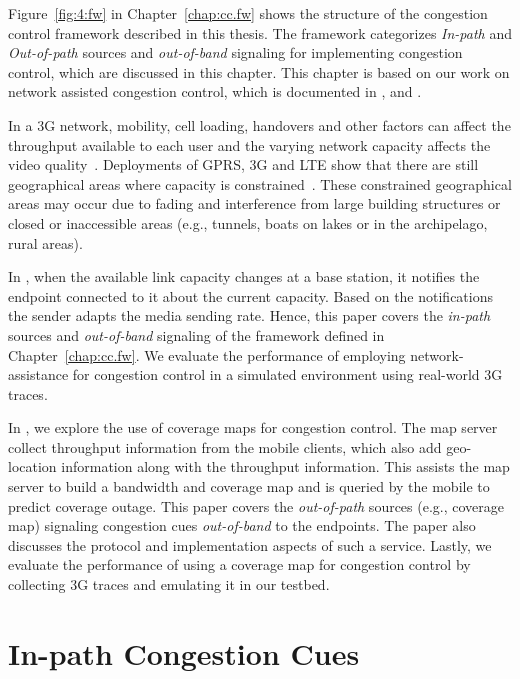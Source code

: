 Figure~\ref{fig:4:fw} in Chapter~\ref{chap:cc.fw} shows the structure of the
congestion control framework described in this thesis. The framework
categorizes \emph{In-path} and \emph{Out-of-path} sources and
\emph{out-of-band} signaling for implementing congestion control, which are
discussed in this chapter. This chapter is based on our work on network
assisted congestion control, which is documented in ,
 and \cite{glass:patent}.

In a 3G network, mobility, cell loading, handovers and other factors can
affect the throughput available to each user and the varying network capacity
affects the video quality~\cite{diaz2007evaluating}. Deployments of GPRS, 3G
and LTE show that there are still geographical areas where capacity is
constrained~\cite{Curcio:glass, 6576402}. These constrained geographical areas
may occur due to fading and interference from large building structures or
closed or inaccessible areas (e.g., tunnels, boats on lakes or in the
archipelago, rural areas).

In , when the available link capacity changes at a base
station, it notifies the endpoint connected to it about the current capacity.
Based on the notifications the sender adapts the media sending rate. Hence,
this paper covers the \emph{in-path} sources and \emph{out-of-band} signaling
of the framework defined in Chapter~\ref{chap:cc.fw}. We evaluate the
performance of employing network-assistance for congestion control in a
simulated environment using real-world 3G traces.

In , we explore the use of coverage maps for congestion
control. The map server collect throughput information from the mobile
clients, which also add geo-location information along with the throughput
information. This assists the map server to build a bandwidth and coverage map
and is queried by the mobile to predict coverage outage. This paper covers the
\emph{out-of-path} sources (e.g., coverage map) signaling congestion cues
\emph{out-of-band} to the endpoints. The paper also discusses the protocol and
implementation aspects of such a service. Lastly, we evaluate the performance
of using a coverage map for congestion control by collecting 3G traces and
emulating it in our testbed.

\section{In-path Congestion Cues}

